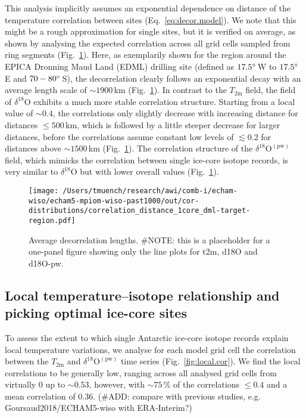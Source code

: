 \documentclass[cp, manuscript]{copernicus}
\begin{document}
This analysis implicitly assumes an exponential dependence on distance of the
temperature correlation between sites (Eq.~\ref{eq:decor.model}). We note that
this might be a rough approximation for single sites, but it is verified on
average, as shown by analysing the expected correlation across all grid cells
sampled from ring segments (Fig.~\ref{fig:avg.decor.lengths}). Here, as
exemplarily shown for the region around the EPICA Dronning Maud Land (EDML)
drilling site (defined as $17.5^{\circ}$\,W to $17.5^{\circ}$\,E and
$70-80^{\circ}$\,S), the decorrelation clearly follows an exponential decay with
an average length scale of $\sim1900$\,km (Fig.~\ref{fig:avg.decor.lengths}). In
contrast to the $T_{2\mathrm{m}}$ field, the field of $\delta^{18}\mathrm{O}$
exhibits a much more stable correlation structure. Starting from a local value
of $\sim0.4$, the correlations only slightly decrease with increasing distance
for distances $\leq500$\,km, which is followed by a little steeper decrease for
larger distances, before the correlations assume constant low levels of
$\lesssim0.2$ for distances above $\sim1500$\,km
(Fig.~\ref{fig:avg.decor.lengths}). The correlation structure of the
$\delta^{18}\mathrm{O}^{\mathrm{(pw)}}$ field, which mimicks the correlation
between single ice-core isotope records, is very similar to
$\delta^{18}\mathrm{O} $ but with lower overall values
(Fig.~\ref{fig:avg.decor.lengths}).

\begin{figure}[t]%
\centering
\texttt{[image: /Users/tmuench/research/awi/comb-i/echam-wiso/echam5-mpiom-wiso-past1000/out/cor-distributions/correlation\_distance\_1core\_dml-target-region.pdf]}
\caption[Average decorrelation lengths]{%
  Average decorrelation lengths. \#NOTE: this is a placeholder for a one-panel
  figure showing only the line plots for t2m, d18O and d18O-pw.}
\label{fig:avg.decor.lengths}%
\end{figure}%

\subsection{Local temperature--isotope relationship and picking optimal ice-core
  sites}\label{results:picking}

To assess the extent to which single Antarctic ice-core isotope records explain
local temperature variations, we analyse for each model grid cell the
correlation between the $T_{2\mathrm{m}}$ and
$\delta^{18}\mathrm{O}^{\mathrm{(pw)}}$ time series
(Fig.~\ref{fig:local.cor}). We find the local correlations to be generally low,
ranging across all analysed grid cells from virtually $0$ up to $\sim0.53$,
however, with $\sim75\,\%$ of the correlations $\leq0.4$ and a mean correlation
of $0.36$. (\#ADD: compare with previous studies, e.g. Goursaud2018/ECHAM5-wiso
with ERA-Interim?)
\end{document}
